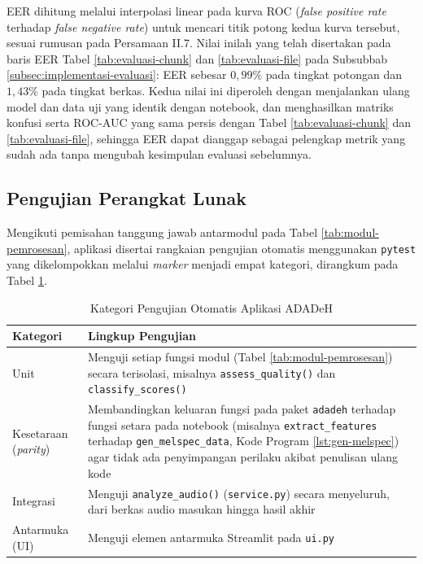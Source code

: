 EER dihitung melalui interpolasi linear pada kurva ROC (\textit{false positive
rate} terhadap \textit{false negative rate}) untuk mencari titik potong kedua
kurva tersebut, sesuai rumusan pada Persamaan II.7. Nilai inilah yang telah
disertakan pada baris EER Tabel \ref{tab:evaluasi-chunk} dan
\ref{tab:evaluasi-file} pada Subsubbab \ref{subsec:implementasi-evaluasi}: EER
sebesar $0{,}99\%$ pada tingkat potongan dan $1{,}43\%$ pada tingkat berkas.
Kedua nilai ini diperoleh dengan menjalankan ulang model dan data uji yang
identik dengan notebook, dan menghasilkan matriks konfusi serta ROC-AUC yang
sama persis dengan Tabel \ref{tab:evaluasi-chunk} dan \ref{tab:evaluasi-file},
sehingga EER dapat dianggap sebagai pelengkap metrik yang sudah ada tanpa
mengubah kesimpulan evaluasi sebelumnya.

\subsection{Pengujian Perangkat Lunak}
\label{subsec:implementasi-pengujian}

Mengikuti pemisahan tanggung jawab antarmodul pada Tabel
\ref{tab:modul-pemrosesan}, aplikasi disertai rangkaian pengujian otomatis
menggunakan \texttt{pytest} yang dikelompokkan melalui \textit{marker} menjadi
empat kategori, dirangkum pada Tabel \ref{tab:kategori-pengujian}.

\begin{table}[htbp]
  \centering
  \caption{Kategori Pengujian Otomatis Aplikasi ADADeH}
  \label{tab:kategori-pengujian}
  \begin{tabular}{@{}lp{8.8cm}@{}}
    \toprule
    \textbf{Kategori} & \textbf{Lingkup Pengujian} \\
    \midrule
    Unit & Menguji setiap fungsi modul (Tabel \ref{tab:modul-pemrosesan}) secara
    terisolasi, misalnya \texttt{assess\_quality()} dan \texttt{classify\_scores()} \\
    Kesetaraan (\textit{parity}) & Membandingkan keluaran fungsi pada paket
    \texttt{adadeh} terhadap fungsi setara pada notebook (misalnya
    \texttt{extract\_features} terhadap \texttt{gen\_melspec\_data}, Kode Program
    \ref{lst:gen-melspec}) agar tidak ada penyimpangan perilaku akibat penulisan
    ulang kode \\
    Integrasi & Menguji \texttt{analyze\_audio()} (\texttt{service.py}) secara
    menyeluruh, dari berkas audio masukan hingga hasil akhir \\
    Antarmuka (UI) & Menguji elemen antarmuka Streamlit pada \texttt{ui.py} \\
    \bottomrule
  \end{tabular}
\end{table}

